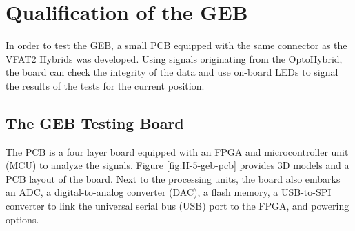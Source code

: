   \section{Qualification of the GEB}

    In order to test the GEB, a small PCB equipped with the same connector as the VFAT2 Hybrids was developed. Using signals originating from the OptoHybrid, the board can check the integrity of the data and use on-board LEDs to signal the results of the tests for the current position.

    \subsection{The GEB Testing Board}

      The PCB is a four layer board equipped with an FPGA and microcontroller unit (MCU) to analyze the signals. Figure \ref{fig:II-5-geb-pcb} provides 3D models and a PCB layout of the board. Next to the processing units, the board also embarks an ADC, a digital-to-analog converter (DAC), a flash memory, a USB-to-SPI converter to link the universal serial bus (USB) port to the FPGA, and powering options.


